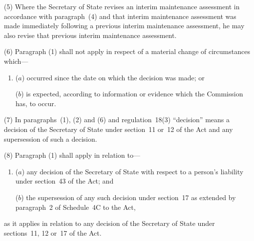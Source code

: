 \documentclass[a4paper,12pt]{article}
\begin{document}
(5) Where the Secretary of State revises an interim maintenance assessment in accordance with paragraph~(4) and that interim maintenance assessment was made immediately following a previous interim maintenance assessment, he may also revise that previous interim maintenance assessment.

%
%
%

(6) Paragraph (1) shall not apply in respect of a material change of circumstances which—
\begin{enumerate}\item[]
($a$) occurred since the date on which the decision was made; or

($b$) is expected, according to information or evidence which the Commission has, to occur.
\end{enumerate}

(7) In paragraphs~(1), (2) and (6) and regulation~18(3) “decision” means a decision of the Secretary of State under section~11 or~12 of the Act and any supersession of such a decision.

(8) Paragraph (1) shall apply in relation to---
\begin{enumerate}\item[]
($a$) any decision of the Secretary of State with respect to 
a person’s liability under section~43 of the Act; and

($b$) the supersession of any such decision under section~17 as extended by paragraph~2 of Schedule~4C to the Act,
\end{enumerate}
as it applies in relation to any decision of the Secretary of State under sections~11, 12 or~17 of the Act.
\end{document}
